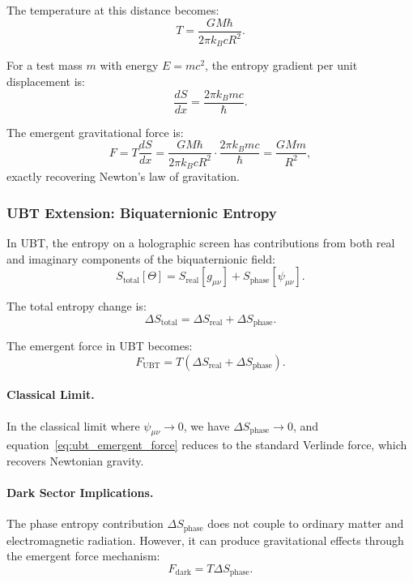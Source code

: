 The temperature at this distance becomes:
\begin{equation}
T = \frac{GM\hbar}{2\pi k_B c R^2}.
\end{equation}

For a test mass $m$ with energy $E = mc^2$, the entropy gradient per unit displacement is:
\begin{equation}
\frac{dS}{dx} = \frac{2\pi k_B mc}{\hbar}.
\end{equation}

The emergent gravitational force is:
\begin{equation}
F = T \frac{dS}{dx} = \frac{GM\hbar}{2\pi k_B c R^2} \cdot \frac{2\pi k_B mc}{\hbar} = \frac{GMm}{R^2},
\label{eq:emergent_newton}
\end{equation}
exactly recovering Newton's law of gravitation.

\subsubsection{UBT Extension: Biquaternionic Entropy}

In UBT, the entropy on a holographic screen has contributions from both real and imaginary components of the biquaternionic field:
\begin{equation}
S_{\text{total}}[\Theta] = S_{\text{real}}[g_{\mu\nu}] + S_{\text{phase}}[\psi_{\mu\nu}].
\end{equation}

The total entropy change is:
\begin{equation}
\Delta S_{\text{total}} = \Delta S_{\text{real}} + \Delta S_{\text{phase}}.
\end{equation}

The emergent force in UBT becomes:
\begin{equation}
F_{\text{UBT}} = T(\Delta S_{\text{real}} + \Delta S_{\text{phase}}).
\label{eq:ubt_emergent_force}
\end{equation}

\paragraph{Classical Limit.}
In the classical limit where $\psi_{\mu\nu} \to 0$, we have $\Delta S_{\text{phase}} \to 0$, and equation~\eqref{eq:ubt_emergent_force} reduces to the standard Verlinde force, which recovers Newtonian gravity.

\paragraph{Dark Sector Implications.}
The phase entropy contribution $\Delta S_{\text{phase}}$ does not couple to ordinary matter and electromagnetic radiation. However, it can produce gravitational effects through the emergent force mechanism:
\begin{equation}
F_{\text{dark}} = T \Delta S_{\text{phase}}.
\end{equation}

